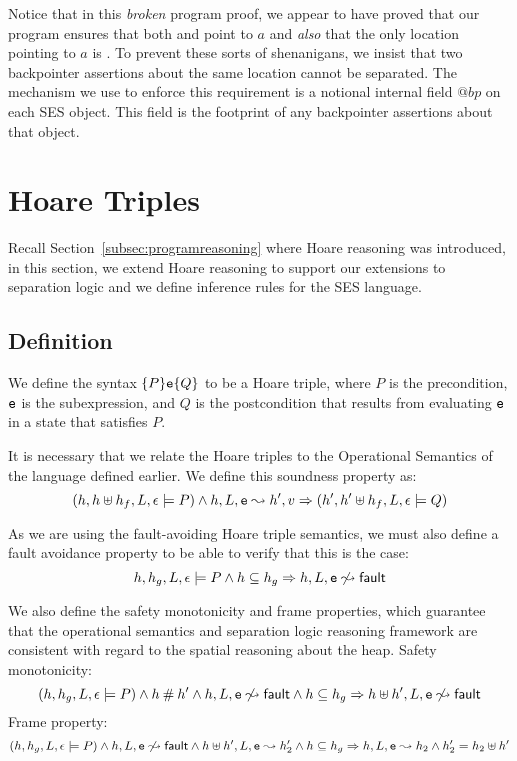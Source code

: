 \documentclass[a4paper,notitlepage]{report}
\begin{document}
Notice that in this \emph{broken} program proof, we appear to have proved that
our program ensures that both  and  point to $a$ and \emph{also}
that the only location pointing to $a$ is . To prevent these sorts of
shenanigans, we insist that two backpointer assertions about the same location
cannot be separated. The mechanism we use to enforce this requirement is a
notional internal field $@bp$ on each SES object. This field is the footprint of
any backpointer assertions about that object.


\section{Hoare Triples}
Recall Section~\ref{subsec:programreasoning} where Hoare reasoning was introduced, in
this section, we extend Hoare reasoning to support our extensions to
separation logic and we define inference rules for the SES language.

\subsection{Definition}
We define the syntax $\{P\}\mathtt{e}\{Q\}$ to be a Hoare triple, where $P$ is the
precondition, $\mathtt{e}$ is the subexpression, and $Q$ is the
postcondition that results from evaluating $\mathtt{e}$ in a state that satisfies $P$.

It is necessary that we relate the Hoare triples to the Operational Semantics of
the language defined earlier. We define this soundness property as:
\[ (h, h \uplus h_f, L, \epsilon \models P) \land h, L, \mathtt{e} \leadsto h', v
  \Rightarrow (h', h' \uplus h_f, L, \epsilon \models Q) \]

As we are using the fault-avoiding Hoare triple semantics, we must also define a
fault avoidance property to be able to verify that this is the case:
\[ h, h_g, L, \epsilon \models P \land h\subseteq h_g \Rightarrow h, L, \mathtt{e} \not\leadsto {\ensuremath{\mathsf{fault}}} \]

We also define the safety monotonicity and frame properties, which guarantee
that the operational semantics and separation logic reasoning framework are
consistent with regard to the spatial reasoning about the heap.
Safety monotonicity:
\[ (h, h_g, L, \epsilon \models P) \land h \mathbin{\#} h' \land h, L, \mathtt{e} \not\leadsto
  {\ensuremath{\mathsf{fault}}} \land h\subseteq h_g \Rightarrow h \uplus h', L, \mathtt{e} \not\leadsto {\ensuremath{\mathsf{fault}}} \]
Frame property:
\[ (h, h_g, L, \epsilon \models P) \land h, L, \mathtt{e} \not\leadsto {\ensuremath{\mathsf{fault}}} \land
  h \uplus h', L, \mathtt{e} \leadsto h_2' \land h\subseteq h_g\Rightarrow h, L, \mathtt{e} \leadsto h_2 \land
  h_2' = h_2 \uplus h' \]
\end{document}
